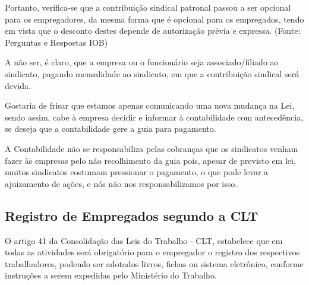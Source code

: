 \documentclass{article}
\begin{document}
Portanto, verifica-se que a contribuição sindical patronal passou a ser opcional para os empregadores, da mesma forma que é opcional para os empregados, tendo em vista que o desconto destes depende de autorização prévia e expressa. (Fonte: Perguntas e Respostas IOB)

A não ser, é claro, que a empresa ou o funcionário seja associado/filiado ao sindicato, pagando mensalidade ao sindicato, em que a contribuição sindical será devida.

Gostaria de frisar que estamos apenas comunicando uma nova mudança na Lei, sendo assim, cabe à empresa decidir e informar à contabilidade com antecedência, se deseja que a contabilidade gere a guia para pagamento. 

\begin{tcolorbox}[title=Atenção!]
  A Contabilidade não se responsabiliza pelas cobranças que os sindicatos venham fazer às empresas pelo não recolhimento da guia pois, apesar de previsto em lei, muitos sindicatos costumam pressionar o pagamento, o que pode levar a ajuizamento de ações,  e nós não nos responsabilizamos por isso.  
\end{tcolorbox}

\subsection{Registro de Empregados segundo a CLT}
\label{ins:registro}
O artigo 41 da Consolidação das Leis do Trabalho - CLT, estabelece que em todas as atividades será obrigatório para o empregador o registro dos respectivos trabalhadores, podendo ser adotados livros, fichas ou sistema eletrônico, conforme instruções a serem expedidas pelo Ministério do Trabalho.
\end{document}
